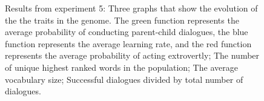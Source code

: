 \begin{figure}
    \centering
    \ContinuedFloat
    \hfill
    \par \bigskip
    \hfill
    \caption{Results from experiment 5:  Three graphs that show the evolution of the the traits in the genome. The green function represents the average probability of conducting parent-child dialogues, the blue function represents the average learning rate, and the red function represents the average probability of acting extrovertly;  The number of unique highest ranked words in the population;  The average vocabulary size;  Successful dialogues divided by total number of dialogues.}
    \label{fig:exp5.1}
\end{figure}

